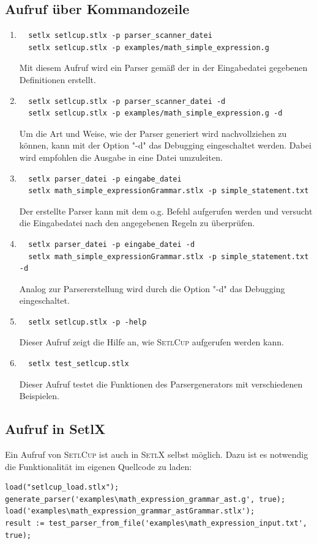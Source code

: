 \subsection{Aufruf über Kommandozeile}
\begin{enumerate}
	\item \begin{Verbatim}
  setlx setlcup.stlx -p parser_scanner_datei
  setlx setlcup.stlx -p examples/math_simple_expression.g
	\end{Verbatim}
			Mit diesem Aufruf wird ein Parser gemäß der in der Eingabedatei gegebenen Definitionen erstellt.
	\item \begin{Verbatim}
  setlx setlcup.stlx -p parser_scanner_datei -d
  setlx setlcup.stlx -p examples/math_simple_expression.g -d
	\end{Verbatim}
			Um die Art und Weise, wie der Parser generiert wird nachvollziehen zu können, kann mit der Option "-d" das Debugging eingeschaltet werden. Dabei wird empfohlen die Ausgabe in eine Datei umzuleiten.
	\item \begin{Verbatim}
  setlx parser_datei -p eingabe_datei
  setlx math_simple_expressionGrammar.stlx -p simple_statement.txt
	\end{Verbatim}
	Der erstellte Parser kann mit dem o.g. Befehl aufgerufen werden und versucht die Eingabedatei nach den angegebenen Regeln zu überprüfen.
		\item \begin{Verbatim}
  setlx parser_datei -p eingabe_datei -d
  setlx math_simple_expressionGrammar.stlx -p simple_statement.txt -d
	\end{Verbatim}
	Analog zur Parsererstellung wird durch die Option "-d" das Debugging eingeschaltet.
	\item \begin{Verbatim}
  setlx setlcup.stlx -p -help
	\end{Verbatim}
			Dieser Aufruf zeigt die Hilfe an, wie \textsc{SetlCup} aufgerufen werden kann.
	\item \begin{Verbatim}
  setlx test_setlcup.stlx
	\end{Verbatim}
			Dieser Aufruf testet die Funktionen des Parsergenerators mit verschiedenen Beispielen.
\end{enumerate}
\subsection{Aufruf in SetlX}
Ein Aufruf von \textsc{SetlCup} ist auch in \textsc{SetlX} selbst möglich. Dazu ist es notwendig die Funktionalität im eigenen Quellcode zu laden:
\begin{Verbatim}
load("setlcup_load.stlx");
generate_parser('examples\math_expression_grammar_ast.g', true);
load('examples\math_expression_grammar_astGrammar.stlx');
result := test_parser_from_file('examples\math_expression_input.txt', true);
\end{Verbatim}
